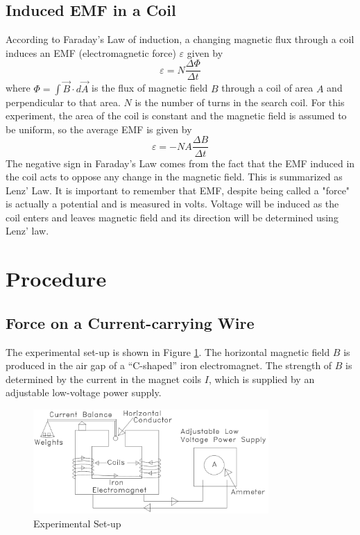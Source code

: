 \subsection{Induced EMF in a Coil}
According to Faraday's Law of induction, a changing magnetic flux through a coil induces an EMF (electromagnetic force) $\varepsilon$ given by
\begin{equation}
  \varepsilon=N\frac{\Delta \Phi}{\Delta t}
\end{equation}
where $\Phi = \int \vec{B} \cdot d \vec{A}$ is the flux of magnetic field $B$ through a coil of area $A$ and perpendicular to that area. $N$ is the number of turns in the search coil. For this experiment, the area of the coil is constant and the magnetic field is assumed to be uniform, so the average EMF is given by
\begin{equation}
  \varepsilon= -NA\frac{\Delta B}{\Delta t}
\end{equation}
The negative sign in Faraday's Law comes from the fact  that the EMF induced in the coil acts to oppose any change in the magnetic field. This is summarized as Lenz' Law. It is important to remember that EMF, despite being called a "force" is actually a potential and is measured in volts. Voltage will be induced as the coil enters and leaves magnetic field and its direction will be determined using Lenz' law.

\section{Procedure}
\subsection{Force on a Current-carrying Wire}

The experimental set-up is shown in Figure {\ref{fig:set-up}}. The horizontal magnetic field $B$ is produced in the air gap of a ``C-shaped'' iron electromagnet. The strength of $B$ is determined by the current in the magnet coils $I$, which is supplied by an adjustable low-voltage power supply.\myskip
\begin{figure}[h]
\centering
\includegraphics[width=0.8\textwidth]{./Exp4/pic/image2.png}
\caption{Experimental Set-up}
\label{fig:set-up}
\end{figure}


